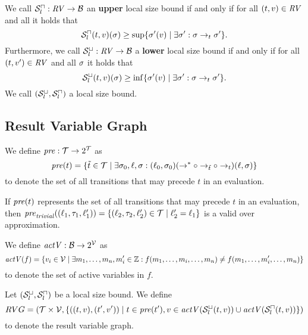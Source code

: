 \begin{definition}
  We call ${\mathcal{S}^\sqcap_l}: \mathit{RV} \rightarrow \mathcal{B}$ an \textbf{upper} local size bound if and only if for all $(t, v) \in \mathit{RV}$ and all  it holds that
  \[ {\mathcal{S}^\sqcap_l}(t, v)(\sigma) \geq \sup \lbrace \sigma'(v) \mid \exists \sigma': \sigma \rightarrow_t \sigma' \rbrace. \]
  Furthermore, we call ${\mathcal{S}^\sqcup_l}: \mathit{RV} \rightarrow \mathcal{B}$ a \textbf{lower} local size bound if and only if for all $(t, v') \in \mathit{RV}$ and all $\sigma$ it holds that
  \[ {\mathcal{S}^\sqcup_l}(t, v)(\sigma) \geq \inf \lbrace \sigma'(v) \mid \exists \sigma': \sigma \rightarrow_t \sigma' \rbrace. \]
  We call ${({\mathcal{S}^\sqcup_l}, {\mathcal{S}^\sqcap_l})}$ a local size bound.
\end{definition}

\subsection{Result Variable Graph}


\begin{definition} 
  We define $\mathit{pre}: \mathcal{T} \rightarrow 2^{\mathcal{T}}$ as
  \[\mathit{pre}(t) = \lbrace \tilde{t} \in \mathcal{T} \mid \exists \sigma_0, \ell, \sigma: (\ell_0, \sigma_0) (\rightarrow^* \circ \rightarrow_{\tilde{t}} \circ \rightarrow_{t}) (\ell, \sigma) \rbrace\]
  to denote the set of all transitions that may precede $t$ in an evaluation.	
\end{definition}

If $\mathit{pre}(t)$ represents the set of all transitions that may precede $t$ in an evaluation, then $\mathit{pre}_{\mathit{trivial}}((\ell_1, \tau_1, \ell_1')) = \lbrace (\ell_2, \tau_2, \ell_2') \in \mathcal{T} \mid \ell_2' = \ell_1 \rbrace$ is a valid over approximation.


\begin{definition} 
	We define $\mathit{actV}: \mathcal{B} \rightarrow 2^{\mathcal{V}}$ as 
	\[ \mathit{actV}(f) = \lbrace  v_i \in \mathcal{V} \mid \exists m_1, \dots, m_n, m_i' \in \mathbb{Z}: f(m_1, \dots, m_i, \dots, m_n) \neq f(m_1, \dots, m_i', \dots, m_n) \rbrace \]
	to denote the set of active variables in $f$.
\end{definition}

\begin{definition}
	Let ${({\mathcal{S}^\sqcup_l}, {\mathcal{S}^\sqcap_l})}$ be a local size bound.
	We define 
	\[ RVG = (\mathcal{T} \times \mathcal{V}, \lbrace ((t, v), (t', v')) \mid t \in \mathit{pre}(t'), v \in \mathit{actV}({\mathcal{S}^\sqcup_l}(t,v)) \cup \mathit{actV}({\mathcal{S}^\sqcap_l}(t,v)) \rbrace) \]
	to denote the result variable graph.
\end{definition}


